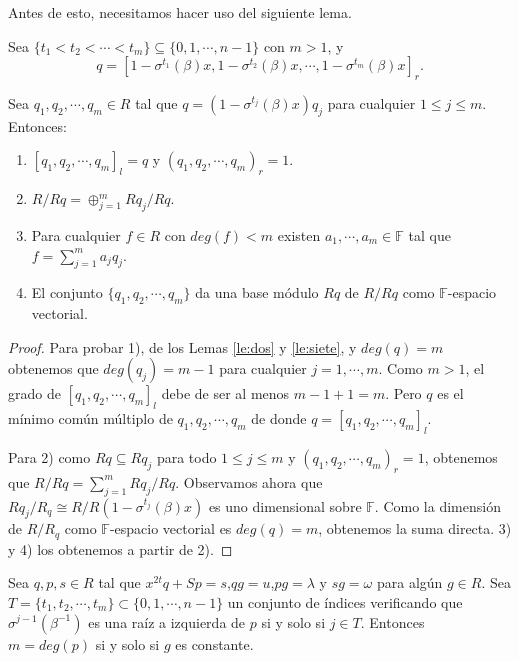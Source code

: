 Antes de esto, necesitamos hacer uso del siguiente lema.

\begin{lemma}
\label{le:veintiseis}
Sea $\{t_1 < t_2 < \cdots < t_m \} \subseteq \{ 0,1,\cdots,n-1 \} $ con $ m > 1$, y 
\[ q = [1-\sigma^{t_1}(\beta)x,1-\sigma^{t_2}(\beta)x,\cdots,1-\sigma^{t_m}(\beta)x ]_r .\]

Sea $q_1,q_2,\cdots,q_m \in R$ tal que $q = (1-\sigma^{t_j}(\beta)x)q_j$ para cualquier $ 1 \leq j \leq m$. Entonces:
\begin{enumerate}
    \item $[q_1,q_2,\cdots,q_m]_l = q$ y $(q_1,q_2,\cdots,q_m)_r = 1$.
    \item $R/Rq = \oplus_{j=1}^m Rq_j/Rq$.
    \item Para cualquier $f \in R$ con $deg(f) < m$ existen $a_1,\cdots, a_m \in \mathbb{F}$ tal que $ f =\sum_{j=1}^m a_jq_j$.
    \item El conjunto $\{ q_1,q_2,\cdots,q_m \}$ da una base módulo $Rq$ de $R/Rq$ como $\mathbb{F}$-espacio vectorial.
\end{enumerate}
\end{lemma}

\begin{proof} Para probar 1), de los Lemas \ref{le:dos} y \ref{le:siete}, y $deg(q) = m$ obtenemos que $deg(q_j) = m-1$ para cualquier $j = 1,\cdots,m$. Como $m>1$, el grado de $[q_1,q_2,\cdots,q_m]_l$ debe de ser al menos $m-1+1 = m$. Pero $q$ es el mínimo común múltiplo de $q_1,q_2,\cdots,q_m$ de donde 
$ q = [q_1,q_2,\cdots,q_m]_l$.

Para 2) como $Rq \subseteq Rq_j$ para todo $1 \leq j \leq m$ y $(q_1,q_2,\cdots,q_m)_r = 1$, obtenemos que $R/Rq = \sum_{j=1}^m Rq_j/Rq$. Observamos ahora que $Rq_j/R_q \cong R/R(1-\sigma^{t_j}(\beta)x)$ es uno dimensional sobre $\mathbb{F}$. Como la dimensión de $R/R_q$ como $\mathbb{F}$-espacio vectorial es $deg(q) = m$, obtenemos la suma directa. 3) y 4) los obtenemos a partir de 2).
\end{proof}


\begin{theorem}
\label{th:quince}
Sea $q,p,s \in R$ tal que $x^{2t}q + Sp = s$,$qg = u$,$pg = \lambda$ y $sg = \omega$ para algún $g \in R$. Sea $T = \{ t_1,t_2,\cdots,t_m \} \subset \{ 0,1,\cdots,n-1 \}$ un conjunto de índices verificando que $\sigma^{j-1}(\beta^{-1})$ es una raíz a izquierda de $p$ si y solo si $j \in T$. Entonces $m = deg(p)$ si y solo si $g$ es constante.
\end{theorem}

